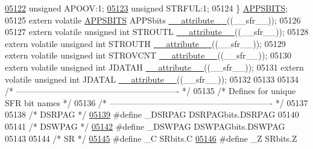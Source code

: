 \begin{DoxyCode}
\hypertarget{a00015_source_l05122}{}\hyperlink{a00014_ac2f8a4bb97218ac7682ddbe3561a04aa}{05122}   \textcolor{keywordtype}{unsigned} APOOV:1;
\hypertarget{a00015_source_l05123}{}\hyperlink{a00014_a6905c1b3f59b4b718e36adffa521659b}{05123}   \textcolor{keywordtype}{unsigned} STRFUL:1;
05124 \} \hyperlink{a00014_d8/d17/a00114}{APPSBITS};
05125 \textcolor{keyword}{extern} \textcolor{keyword}{volatile} \hyperlink{a00014_d8/d17/a00114}{APPSBITS} APPSbits \hyperlink{a00015_a493c46f03454991ccc5aa7a6e1dfb2a7}{\_\_attribute\_\_}((\_\_sfr\_\_));
05126 
05127 \textcolor{keyword}{extern} \textcolor{keyword}{volatile} \textcolor{keywordtype}{unsigned} \textcolor{keywordtype}{int}  STROUTL \hyperlink{a00015_a493c46f03454991ccc5aa7a6e1dfb2a7}{\_\_attribute\_\_}((\_\_sfr\_\_));
05128 \textcolor{keyword}{extern} \textcolor{keyword}{volatile} \textcolor{keywordtype}{unsigned} \textcolor{keywordtype}{int}  STROUTH \hyperlink{a00015_a493c46f03454991ccc5aa7a6e1dfb2a7}{\_\_attribute\_\_}((\_\_sfr\_\_));
05129 \textcolor{keyword}{extern} \textcolor{keyword}{volatile} \textcolor{keywordtype}{unsigned} \textcolor{keywordtype}{int}  STROVCNT \hyperlink{a00015_a493c46f03454991ccc5aa7a6e1dfb2a7}{\_\_attribute\_\_}((\_\_sfr\_\_));
05130 \textcolor{keyword}{extern} \textcolor{keyword}{volatile} \textcolor{keywordtype}{unsigned} \textcolor{keywordtype}{int}  JDATAH \hyperlink{a00015_a493c46f03454991ccc5aa7a6e1dfb2a7}{\_\_attribute\_\_}((\_\_sfr\_\_));
05131 \textcolor{keyword}{extern} \textcolor{keyword}{volatile} \textcolor{keywordtype}{unsigned} \textcolor{keywordtype}{int}  JDATAL \hyperlink{a00015_a493c46f03454991ccc5aa7a6e1dfb2a7}{\_\_attribute\_\_}((\_\_sfr\_\_));
05132 
05133 
05134 \textcolor{comment}{/* ---------------------------------------------------------- */}
05135 \textcolor{comment}{/* Defines for unique SFR bit names                           */}
05136 \textcolor{comment}{/* ---------------------------------------------------------- */}
05137 
05138 \textcolor{comment}{/* DSRPAG */}
\hypertarget{a00015_source_l05139}{}\hyperlink{a00015_ab8211a5e1c9536ac12831224f03ab270}{05139} \textcolor{preprocessor}{#define \_DSRPAG DSRPAGbits.DSRPAG}
05140 
05141 \textcolor{comment}{/* DSWPAG */}
\hypertarget{a00015_source_l05142}{}\hyperlink{a00015_a6e44b92d3c190e7c1fd9380a2d29683c}{05142} \textcolor{preprocessor}{#define \_DSWPAG DSWPAGbits.DSWPAG}
05143 
05144 \textcolor{comment}{/* SR */}
\hypertarget{a00015_source_l05145}{}\hyperlink{a00015_a6979fbabd6378fb160ac676f18dff927}{05145} \textcolor{preprocessor}{#define \_C SRbits.C}
\hypertarget{a00015_source_l05146}{}\hyperlink{a00015_aa73b64c328f03645b51ee9bf5ce73640}{05146} \textcolor{preprocessor}{#define \_Z SRbits.Z}

\end{DoxyCode}
